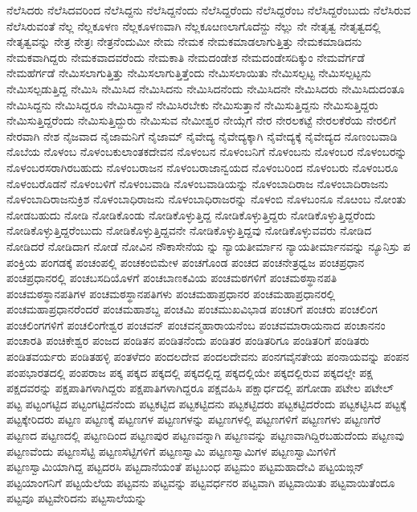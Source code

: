 {ನೆಲೆಸಿದರು
ನೆಲೆಸಿದವರಿಂದ
ನೆಲೆಸಿದ್ದನು
ನೆಲೆಸಿದ್ದನೆಂದು
ನೆಲೆಸಿದ್ದರೆಂದು
ನೆಲೆಸಿದ್ದರೆಂಬ
ನೆಲೆಸಿದ್ದರೆಂಬುದು
ನೆಲೆಸಿರುವ
ನೆಲೆಸಿರುವಂತೆ
ನೆಲ್ಲ
ನೆಲ್ಲಕೂಳಣ
ನೆಲ್ಲಕೂಳಣವಾಗಿ
ನೆಲ್ಲಕೂೞಣಲಾಗೊದೆನ್ದು
ನೆಲ್ಲು
ನೇ
ನೇತೃತ್ವ
ನೇತೃತ್ವದಲ್ಲಿ
ನೇತೃತ್ವವನ್ನು
ನೇತ್ರ
ನೇತ್ರಃ
ನೇತ್ರನೆಂದುಮೀ
ನೇಮ
ನೇಮಕ
ನೇಮಕಮಾಡಲಾಗುತ್ತಿತ್ತು
ನೇಮಕಮಾಡಿದನು
ನೇಮಕವಾಗಿದ್ದರು
ನೇಮಕವಾದವರೆಂದು
ನೇಮಕಾತಿ
ನೇಮದಂಡೇಶ
ನೇಮದಂಡೇಸದಿಕ್ಕುಂ
ನೇಮವೆರ್ಗಡೆ
ನೇಮಹೆರ್ಗಡೆ
ನೇಮಿಸಲಾಗುತ್ತಿತ್ತು
ನೇಮಿಸಲಾಗುತ್ತಿತ್ತೆಂದು
ನೇಮಿಸಲಾಯಿತು
ನೇಮಿಸಲ್ಪಟ್ಟ
ನೇಮಿಸಲ್ಪಟ್ಟನು
ನೇಮಿಸಲ್ಪಡುತ್ತಿದ್ದ
ನೇಮಿಸಿ
ನೇಮಿಸಿದ
ನೇಮಿಸಿದನು
ನೇಮಿಸಿದನೆಂದು
ನೇಮಿಸಿದನೇ
ನೇಮಿಸಿದರು
ನೇಮಿಸಿದುದಂತೂ
ನೇಮಿಸಿದ್ದನು
ನೇಮಿಸಿದ್ದರೂ
ನೇಮಿಸಿದ್ದಾನೆ
ನೇಮಿಸಿರಬೇಕು
ನೇಮಿಸುತ್ತಾನೆ
ನೇಮಿಸುತ್ತಿದ್ದನು
ನೇಮಿಸುತ್ತಿದ್ದರು
ನೇಮಿಸುತ್ತಿದ್ದರೆಂದು
ನೇಮಿಸುತ್ತಿದ್ದುರು
ನೇಮಿಸುವ
ನೇಮೀಶ್ವರ
ನೇಯ್ಗೆಗೆ
ನೇರ
ನೇರಲಕಟ್ಟೆ
ನೇರಲಕೆರೆಯ
ನೇರಲಿಗೆ
ನೇರವಾಗಿ
ನೇಶ
ನೈಜವಾದ
ನೈಜಾಮನಿಗೆ
ನೈಜಾಮ್
ನೈವೇದ್ಯ
ನೈವೇದ್ಯಕ್ಕಾಗಿ
ನೈವೇದ್ಯಕ್ಕೆ
ನೈವೇದ್ಯದ
ನೊಣಂಬವಾಡಿ
ನೊಬೆಯ
ನೊಳಂಬ
ನೊಳಂಬಕುಲಾಂತಕದೇವನ
ನೊಳಂಬನ
ನೊಳಂಬನಿಗೆ
ನೊಳಂಬನು
ನೊಳಂಬರ
ನೊಳಂಬರನ್ನು
ನೊಳಂಬರಸರಾಗಿರಬಹುದು
ನೊಳಂಬರಾಜನ
ನೊಳಂಬರಾಜಾನ್ವಯದ
ನೊಳಂಬರಿಂದ
ನೊಳಂಬರು
ನೊಳಂಬರೂ
ನೊಳಂಬರೊಡನೆ
ನೊಳಂಬಳಿಗೆ
ನೊಳಂಬವಾಡಿ
ನೊಳಂಬವಾಡಿಯನ್ನು
ನೊಳಂಬಾದಿರಾಜ
ನೊಳಂಬಾದಿರಾಜನು
ನೊಳಂಬಾದಿರಾಜನುಕ್ರಿಶ
ನೊಳಂಬಾಧಿರಾಜನು
ನೊಳಂಬಾಧಿರಾಜರನ್ನು
ನೊಳಂಬಿ
ನೊಳಬಂನೂ
ನೊೞಂಬ
ನೋಂತು
ನೋಡಬಹುದು
ನೋಡಿ
ನೋಡಿಕೊಂಡು
ನೋಡಿಕೊಳ್ಳುತ್ತಿದ್ದ
ನೋಡಿಕೊಳ್ಳುತ್ತಿದ್ದರು
ನೋಡಿಕೊಳ್ಳುತ್ತಿದ್ದರೆಂದು
ನೋಡಿಕೊಳ್ಳುತ್ತಿದ್ದರೆಂಬುದು
ನೋಡಿಕೊಳ್ಳುತ್ತಿದ್ದವನೇ
ನೋಡಿಕೊಳ್ಳುತ್ತಿದ್ದವು
ನೋಡಿಕೊಳ್ಳುವವರು
ನೋಡಿದ
ನೋಡಿದರೆ
ನೋಡಿದಾಗ
ನೋಡೆ
ನೋವಿನ
ನೌಕಾಸೇನೆಯ
ನ್ನು
ನ್ಯಾಯತೀರ್ಮಾನ
ನ್ಯಾಯತೀರ್ಮಾನವನ್ನು
ನ್ಯೂನಿಸ್ರು
ಪ
ಪಂಕ್ತಿಯ
ಪಂಗಡಕ್ಕೆ
ಪಂಚಂಪಲ್ಲಿ
ಪಂಚಕಂಬಿಮೇಳ
ಪಂಚಗೊಂಡ
ಪಂಚದ
ಪಂಚನೇತ್ರಧ್ವಜ
ಪಂಚಪ್ರಧಾನ
ಪಂಚಪ್ರಧಾನರಲ್ಲಿ
ಪಂಚಬಸದಿಯೊಳಗೆ
ಪಂಚಬಾಣಕವಿಯ
ಪಂಚಮಠಗಳಿಗೆ
ಪಂಚಮಠಸ್ಥಾನಪತಿ
ಪಂಚಮಠಸ್ಥಾನಪತಿಗಳ
ಪಂಚಮಠಸ್ಥಾನಪತಿಗಳು
ಪಂಚಮಹಾಪ್ರಧಾನರ
ಪಂಚಮಹಾಪ್ರಧಾನರಲ್ಲಿ
ಪಂಚಮಹಾಪ್ರಧಾನರೆಂದರೆ
ಪಂಚಮಹಾಶಬ್ದ
ಪಂಚಮಿ
ಪಂಚಮುಖವಿಭಾಡ
ಪಂಚರಿಗೆ
ಪಂಚರು
ಪಂಚಲಿಂಗ
ಪಂಚಲಿಂಗಗಳಿಗೆ
ಪಂಚಲಿಂಗೇಶ್ವರ
ಪಂಚವನ್
ಪಂಚವನ್ಮಹಾರಾಯನೆಂಬ
ಪಂಚವಮಾರಾಯನಾದ
ಪಂಚಾನನಂ
ಪಂಚಾರತಿ
ಪಂಚಿಕೇಶ್ವರ
ಪಂಜದ
ಪಂಡಿತನ
ಪಂಡಿತನೆಂದು
ಪಂಡಿತರ
ಪಂಡಿತರಿಗೂ
ಪಂಡಿತರಿಗೆ
ಪಂಡಿತರು
ಪಂಡಿತವರ್ಯರು
ಪಂಡಿತಹಳ್ಳಿ
ಪಂತಳೆದಂ
ಪಂದಲದೇವ
ಪಂದಲದೇವನು
ಪಂನಗವೈನತೇಯ
ಪಂನಾಯವನ್ನು
ಪಂಪನ
ಪಂಪಭಾರತದಲ್ಲಿ
ಪಂಪರಾಜ
ಪಕ್ಕ
ಪಕ್ಕದ
ಪಕ್ಕದಲ್ಲಿ
ಪಕ್ಕದಲ್ಲಿದ್ದ
ಪಕ್ಕದಲ್ಲಿಯೇ
ಪಕ್ಕದಲ್ಲಿರುವ
ಪಕ್ಕದಲ್ಲೇ
ಪಕ್ಷ
ಪಕ್ಷದವರನ್ನು
ಪಕ್ಷಪಾತಿಗಳಾಗಿದ್ದರು
ಪಕ್ಷಪಾತಿಗಳಾಗಿದ್ದರೂ
ಪಕ್ಷವಹಿಸಿ
ಪಕ್ಷಾರ್ಧದಲ್ಲಿ
ಪಗೋಡಾ
ಪಟೇಲ
ಪಟೇಲ್
ಪಟ್ಟ
ಪಟ್ಟಂಗಟ್ಟಿದ
ಪಟ್ಟಂಗಟ್ಟಿದನೆಂದು
ಪಟ್ಟಕಟ್ಟಿದ
ಪಟ್ಟಕಟ್ಟಿದನು
ಪಟ್ಟಕಟ್ಟಿದರು
ಪಟ್ಟಕಟ್ಟಿದರೆಂದು
ಪಟ್ಟಕಟ್ಟಿಸಿದ
ಪಟ್ಟಕ್ಕೆ
ಪಟ್ಟಕ್ಕೇರಿದರು
ಪಟ್ಟಣ
ಪಟ್ಟಣಕ್ಕೆ
ಪಟ್ಟಣಗಳ
ಪಟ್ಟಣಗಳನ್ನು
ಪಟ್ಟಣಗಳಲ್ಲಿ
ಪಟ್ಟಣಗಳಿಗೆ
ಪಟ್ಟಣಗಳು
ಪಟ್ಟಣಗೆರೆ
ಪಟ್ಟಣದ
ಪಟ್ಟಣದಲ್ಲಿ
ಪಟ್ಟಣದಿಂದ
ಪಟ್ಟಣಪುರ
ಪಟ್ಟಣವನ್ನಾಗಿ
ಪಟ್ಟಣವನ್ನು
ಪಟ್ಟಣವಾಗಿದ್ದಿರಬಹುದೆಂದು
ಪಟ್ಟಣವು
ಪಟ್ಟಣವೆಂದು
ಪಟ್ಟಣಸೆಟ್ಟಿ
ಪಟ್ಟಣಸೆಟ್ಟಿಗಳಿಗೆ
ಪಟ್ಟಣಸ್ವಾಮಿ
ಪಟ್ಟಣಸ್ವಾಮಿಗಳ
ಪಟ್ಟಣಸ್ವಾಮಿಗಳಿಗೆ
ಪಟ್ಟಣಸ್ವಾಮಿಯಾಗಿದ್ದ
ಪಟ್ಟದರಸಿ
ಪಟ್ಟದಾನೆಯಂತೆ
ಪಟ್ಟಬಂಧ
ಪಟ್ಟಮಂ
ಪಟ್ಟಮಹಾದೇವಿ
ಪಟ್ಟಯಙ್ಗನ್
ಪಟ್ಟಯಾಂಗನಿಗೆ
ಪಟ್ಟಯೆಲೆಯ
ಪಟ್ಟವನು
ಪಟ್ಟವನ್ನು
ಪಟ್ಟವರ್ಧನರ
ಪಟ್ಟವಾಗಿ
ಪಟ್ಟವಾಯಿತು
ಪಟ್ಟವಾಯಿತೆಂದೂ
ಪಟ್ಟವೂ
ಪಟ್ಟವೇರಿದನು
ಪಟ್ಟಸಾಲೆಯನ್ನು
}
